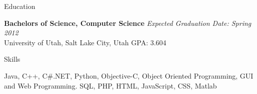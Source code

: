 \documentclass{resume}
\begin{document}
\begin{rSection}{Education}

{\bf Bachelors of Science, Computer Science} \hfill {\em Expected Graduation Date: Spring 2012} \\ 
University of Utah, Salt Lake City, Utah \hfill  GPA: 3.604

\end{rSection}


\begin{rSection}{Skills}

Java, C++, C\#.NET, Python, Objective-C, Object Oriented Programming, GUI and Web Programming. SQL, PHP, HTML, JavaScript, CSS, Matlab

\end{rSection}

\end{document}
